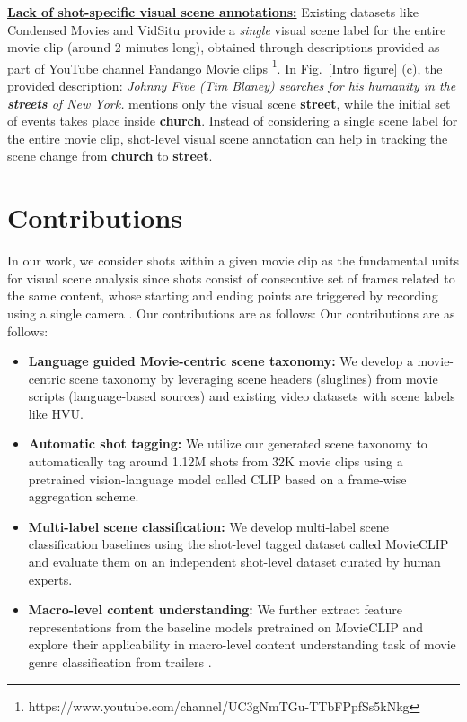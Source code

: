 \textbf{\underline{Lack of shot-specific visual scene annotations:}} Existing datasets like Condensed Movies \cite{bain2020condensed} and VidSitu \cite{Sadhu_2021_CVPR} provide a {\em single} visual scene label for the entire movie clip (around 2 minutes long), obtained through descriptions provided as part of YouTube channel Fandango Movie clips \footnote{https://www.youtube.com/channel/UC3gNmTGu-TTbFPpfSs5kNkg}. In Fig.~\ref{Intro figure} (c), the provided description: \textit{Johnny Five (Tim Blaney) searches for his humanity in the \textbf{streets} of New York.} mentions only the visual scene \textbf{street}, while the initial set of events takes place inside \textbf{church}. Instead of considering a single scene label for the entire movie clip, shot-level visual scene annotation can help in tracking the scene change from \textbf{church} to \textbf{street}.
\section{Contributions}
In our work, we consider shots within a given movie clip as the fundamental units for visual scene analysis since shots consist of consecutive set of frames related to the same content, whose starting and ending points are triggered by recording using a single camera \cite{SBD}. Our contributions are as follows:
Our contributions are as follows:
\begin{itemize}
\item \textbf{Language guided Movie-centric scene taxonomy:} We develop a movie-centric scene taxonomy by leveraging scene headers (sluglines) from movie scripts (language-based sources) and existing video datasets with scene labels like HVU\cite{diba_large_2020}. 
\item \textbf{Automatic shot tagging:} We utilize our generated scene taxonomy to automatically tag around 1.12M shots from 32K movie clips using a pretrained vision-language model called CLIP \cite{CLIP} based on a frame-wise aggregation scheme.  
\item \textbf{Multi-label scene classification:} We develop multi-label scene classification baselines using the shot-level tagged dataset called MovieCLIP and evaluate them on an independent shot-level dataset curated by human experts. 

\item \textbf{Macro-level content understanding:} We further extract feature representations from the baseline models pretrained on MovieCLIP and explore their applicability in macro-level content understanding task of movie genre classification from trailers \cite{2019Moviescope}. 
\end{itemize}
